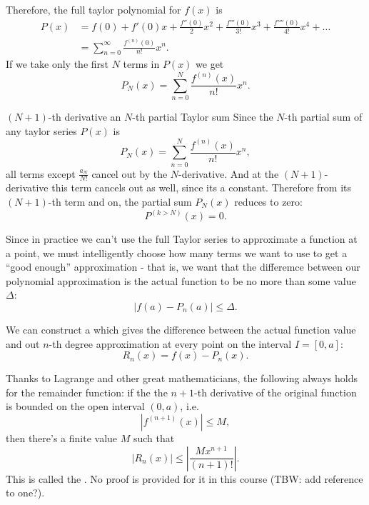 Therefore, the full taylor polynomial for $f(x)$ is
\begin{equation}
	\begin{aligned}
		P(x) &= f(0) + f'(0)x + \frac{f''(0)}{2}x^{2} + \frac{f'''(0)}{3!}x^{3} + \frac{f''''(0)}{4!}x^{4} + \dots\\
			 &= \sum\limits_{n=0}^{\infty}\frac{f^{(n)}(0)}{n!}x^n.
	\end{aligned}
	\label{eq:taylor_series_around_0_full}
\end{equation}
If we take only the first $N$ terms in $P(x)$ we get
\begin{equation}
	P_{N}(x) = \sum\limits_{n=0}^{N}\frac{f^{(n)}(x)}{n!}x^{n}.
	\label{eq:partial_taylor_sum}
\end{equation}

\begin{note}{$(N+1)$-th derivative an $N$-th partial Taylor sum}{}
	Since the $N$-th partial sum of any taylor series $P(x)$ is 
	\[
		P_{N}(x)=\sum\limits_{n=0}^{N}\frac{f^{(n)}(x)}{n!}x^{n},
	\]
	all terms except $\frac{a_{N}}{N!}$ cancel out by the $N$-derivative. And at the $(N+1)$-derivative this term cancels out as well, since its a constant. Therefore from its $(N+1)$-th term and on, the partial sum $P_{N}(x)$ reduces to zero:
	\[
		P^{(k>N)}(x) = 0.
	\]
\end{note}

Since in practice we can't use the full Taylor series to approximate a function at a point, we must intelligently choose how many terms we want to use to get a \enquote{good enough} approximation - that is, we want that the differemce between our polynomial approximation is the actual function to be no more than some value $\Delta$:
\begin{equation}
	\left|f(a) - P_{n}(a)\right| \leq \Delta.
	\label{eq:taylor_error_1}
\end{equation}

We can construct a  which gives the difference between the actual function value and out $n$-th degree approximation at every point on the interval $I=[0, a]$:
\begin{equation}
	R_{n}(x) = f(x) - P_{n}(x).
	\label{eq:taylor_error_2}
\end{equation}

Thanks to Lagrange and other great mathematicians, the following always holds for the remainder function: if the the $n+1$-th derivative of the original function is bounded on the open interval $(0, a)$, i.e.
\begin{equation}
	\left| f^{(n+1)}(x) \right| \leq M,
\end{equation}
then there's a finite value $M$ such that
\begin{equation}
	\left| R_{n}(x) \right| \leq \left| \frac{Mx^{n+1}}{(n+1)!} \right|.
	\label{eq:lagrange_error_bound}
\end{equation}
This is called the . No proof is provided for it in this course (TBW: add reference to one?).

